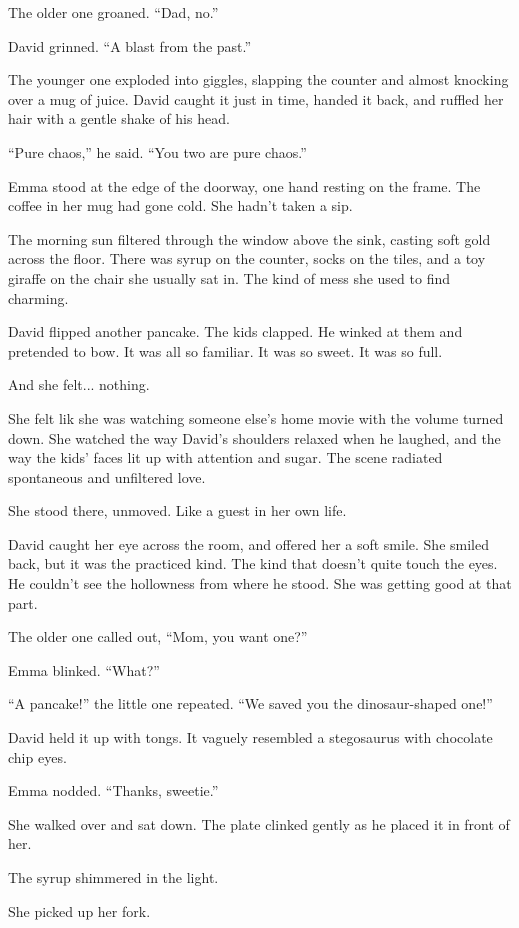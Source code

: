 The older one groaned. “Dad, no.”

David grinned. “A blast from the past.”

The younger one exploded into giggles, slapping the counter and almost knocking over a mug of juice.
David caught it just in time, handed it back, and ruffled her hair with a gentle shake of his head.

“Pure chaos,” he said. “You two are pure chaos.”

Emma stood at the edge of the doorway, one hand resting on the frame. The coffee in her mug had gone cold. 
She hadn’t taken a sip.

The morning sun filtered through the window above the sink, casting soft gold across the floor. There was 
syrup on the counter, socks on the tiles, and a toy giraffe on the chair she usually sat in. The kind of mess 
she used to find charming. 

David flipped another pancake. The kids clapped. He winked at them and pretended to bow. It was all so familiar. 
It was so sweet. It was so full.

And she felt... nothing.

She felt lik she was watching someone else’s home movie with the volume turned down. She watched the way David’s 
shoulders relaxed when he laughed, and the way the kids’ faces lit up with attention and sugar. The scene 
radiated spontaneous and unfiltered love.

She stood there, unmoved. Like a guest in her own life.

David caught her eye across the room, and offered her a soft smile. She smiled back, but it was the practiced 
kind. The kind that doesn’t quite touch the eyes. He couldn’t see the hollowness from where he stood. She was 
getting good at that part.

The older one called out, ``Mom, you want one?''

Emma blinked. ``What?''

``A pancake!'' the little one repeated. ``We saved you the dinosaur-shaped one!''

David held it up with tongs. It vaguely resembled a stegosaurus with chocolate chip eyes.

Emma nodded. ``Thanks, sweetie.''

She walked over and sat down. The plate clinked gently as he placed it in front of her.

The syrup shimmered in the light.

She picked up her fork.

